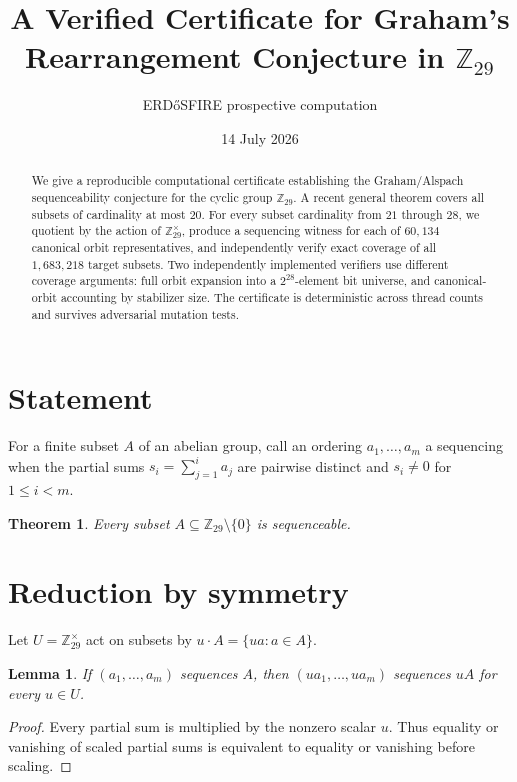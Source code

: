 \documentclass[11pt]{article}
\title{A Verified Certificate for Graham's Rearrangement Conjecture in $\mathbb Z_{29}$}
\author{ERD\H{o}SFIRE prospective computation}
\date{14 July 2026}
\newtheorem{theorem}{Theorem}
\newtheorem{lemma}{Lemma}
\begin{document}
\maketitle

\begin{abstract}
We give a reproducible computational certificate establishing the Graham/Alspach sequenceability conjecture for the cyclic group $\mathbb Z_{29}$. A recent general theorem \cite{costa2026} covers all subsets of cardinality at most $20$. For every subset cardinality from $21$ through $28$, we quotient by the action of $\mathbb Z_{29}^{\times}$, produce a sequencing witness for each of $60{,}134$ canonical orbit representatives, and independently verify exact coverage of all $1{,}683{,}218$ target subsets. Two independently implemented verifiers use different coverage arguments: full orbit expansion into a $2^{28}$-element bit universe, and canonical-orbit accounting by stabilizer size. The certificate is deterministic across thread counts and survives adversarial mutation tests.
\end{abstract}

\section{Statement}
For a finite subset $A$ of an abelian group, call an ordering $a_1,\dots,a_m$ a sequencing when the partial sums $s_i=\sum_{j=1}^i a_j$ are pairwise distinct and $s_i\ne0$ for $1\le i<m$.

\begin{theorem}
Every subset $A\subseteq\mathbb Z_{29}\setminus\{0\}$ is sequenceable.
\end{theorem}

\section{Reduction by symmetry}
Let $U=\mathbb Z_{29}^{\times}$ act on subsets by $u\cdot A=\{ua:a\in A\}$.

\begin{lemma}
If $(a_1,\dots,a_m)$ sequences $A$, then $(ua_1,\dots,ua_m)$ sequences $uA$ for every $u\in U$.
\end{lemma}
\begin{proof}
Every partial sum is multiplied by the nonzero scalar $u$. Thus equality or vanishing of scaled partial sums is equivalent to equality or vanishing before scaling.
\end{proof}
\end{document}
